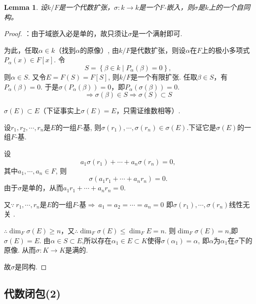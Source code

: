 \documentclass[UTF8]{article}
\newtheorem{lem}{Lemma}[section]
\begin{document}
\begin{lem}
设$k/F$是一个代数扩张，$\sigma: k\longrightarrow k$是一个$F$-嵌入，则$\sigma$是$k$上的一个自同构。
\end{lem}
\begin{proof}：由于域嵌入必是单的，故只须让$\sigma$是一个满射即可.
	
	
	为此，任取$\alpha\in k$（找到$\alpha$的原像）,
	由$k/F$是代数扩张，则设$\alpha$在$F$上的极小多项式$P_{\alpha}(x)\in F[x]$.
	令
	$$S=\left\{ \beta\in k \mid P_{\alpha}(\beta)=0\right\},$$
	则$\alpha\in S$.
	又令$E=F(S)=F[S]$,
	则$k/F$是一个有限扩张. 
	任取$\beta\in S$，有$P_{\alpha}(\beta)=0$.
	于是$\sigma\left( P_{\alpha}(\beta)\right)=0$，即$P_{\alpha}\left(\sigma\left(\beta\right)\right)=0$.
	$$\Rightarrow\sigma(\beta)\in S\Rightarrow\sigma(S)\subset S$$
	
	$\sigma(E)\subset E$（下证事实上$\sigma(E)=E$，只需证维数相等）.
	
	设$r_{1}, r_{2}, \cdots, r_{n}$是$E$的一组$F$-基,
	则$\sigma\left(r_{1}\right),\cdots,\sigma\left(r_{n}\right) \in \sigma(E)$.下证它是$\sigma(E)$的一组$F$-基.
	
	设
	$$a_1\sigma(r_1)+\cdots+a_n\sigma(r_n)=0,$$
	其中$a_{1},\cdots,a_{n} \in F$,
	则
	$$\sigma\left(a_{1} r_{1}+\cdots+a_{n} r_{n}\right)=0.$$
	由于$\sigma$是单的，从而$a_1r_1+\cdots+a_nr_n=0.$
	
	又$\because\ r_1,\cdots, r_n$是$E$的一组$F$-基$\Rightarrow\ a_{1}=a_{2}=\cdots=a_{n}=0$
	即$\sigma\left(r_{1}\right),\cdots,\sigma\left(r_{n}\right)$线性无关 .
	
	$\therefore\dim_F\sigma(E)\geqslant n$，又$\therefore\dim_F\sigma(E)\leqslant \dim_FE=n$.
	则$\dim_F\sigma(E)=n$,即$\sigma(E)=E$.
	由$\alpha\in S\subset E$,所以存在$\alpha_{1}\in E\subset K$使得$\sigma(\alpha_{1})=\alpha$,
	即$\alpha$为$\alpha_{1}$在$\sigma$下的原像.
	从而$\sigma:K\longrightarrow K$是满的.
	
	故$\sigma$是同构.
	
	
\end{proof}






\subsection{代数闭包(2)}
\normalsize
\end{document}
